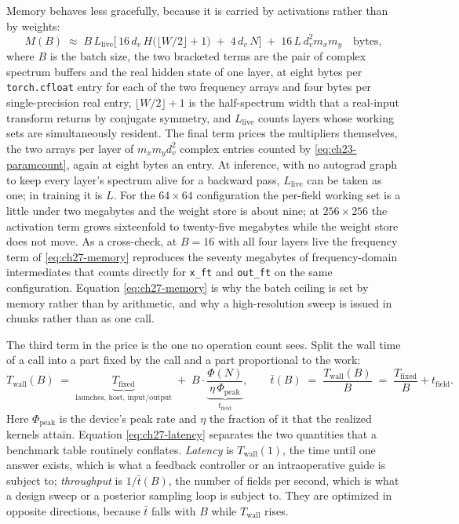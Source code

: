 Memory behaves less gracefully, because it is carried by activations rather than
by weights:
\begin{equation}
  \label{eq:ch27-memory}
  M(B) \;\approx\; B\,L_{\mathrm{live}}\Big[\,16\,d_v\,H\big(\lfloor W/2\rfloor+1\big)
  \;+\; 4\,d_v\,N\Big]
  \;+\; 16\,L\,d_v^{2}m_x m_y
  \quad \text{bytes},
\end{equation}
where $B$ is the batch size, the two bracketed terms are the pair of complex
spectrum buffers and the real hidden state of one layer, at eight bytes per
\texttt{torch.cfloat} entry for each of the two frequency arrays and four bytes per
single-precision real entry, $\lfloor W/2\rfloor+1$ is the half-spectrum width that a
real-input transform returns by conjugate symmetry, and $L_{\mathrm{live}}$ counts
layers whose working sets are simultaneously resident. The final term prices the
multipliers themselves, the two arrays per layer of $m_x m_y d_v^{2}$ complex
entries counted by \eqref{eq:ch23-paramcount}, again at eight bytes an entry.
At inference, with no autograd graph to keep every
layer's spectrum alive for a backward pass, $L_{\mathrm{live}}$ can be taken as
one; in training it is $L$. For the $64\times64$ configuration the per-field
working set is a little under two megabytes and the weight store is about nine; at
$256\times256$ the activation term grows sixteenfold to twenty-five megabytes while
the weight store does not move. As a cross-check, at $B=16$ with all four layers
live the frequency term of \eqref{eq:ch27-memory} reproduces the seventy
megabytes of frequency-domain intermediates that
 counts directly for
\texttt{x\_ft} and \texttt{out\_ft} on the same configuration. Equation
\eqref{eq:ch27-memory} is why the batch ceiling is set by memory rather than by
arithmetic, and why a high-resolution sweep is issued in chunks rather than as one
call.

The third term in the price is the one no operation count sees. Split the wall
time of a call into a part fixed by the call and a part proportional to the work:
\begin{equation}
  \label{eq:ch27-latency}
  T_{\mathrm{wall}}(B) \;=\; \underbrace{T_{\mathrm{fixed}}}_{\text{launches, host, input/output}}
  \;+\; B\cdot \underbrace{\frac{\Phi(N)}{\eta\,\Phi_{\mathrm{peak}}}}_{t_{\mathrm{field}}},
  \qquad
  \bar{t}(B) \;=\; \frac{T_{\mathrm{wall}}(B)}{B} \;=\; \frac{T_{\mathrm{fixed}}}{B} + t_{\mathrm{field}} .
\end{equation}
Here $\Phi_{\mathrm{peak}}$ is the device's peak rate and $\eta$ the fraction of
it that the realized kernels attain. Equation \eqref{eq:ch27-latency} separates
the two quantities that a benchmark table routinely conflates. \emph{Latency} is
$T_{\mathrm{wall}}(1)$, the time until one answer exists, which is what a
feedback controller or an intraoperative guide is subject to; \emph{throughput} is
$1/\bar{t}(B)$, the number of fields per second, which is what a design sweep or a
posterior sampling loop is subject to. They are optimized in opposite directions,
because $\bar{t}$ falls with $B$ while $T_{\mathrm{wall}}$ rises.


